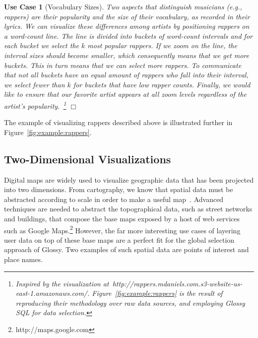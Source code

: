 \documentclass[11pt, oneside]{report}
\newtheorem{usecase}{Use Case}
\newcommand{\mathendbox}{\hfill$\Box$}
\begin{document}
{\begin{usecase}[Vocabulary Sizes]\label{ex:rappers}
Two aspects that distinguish musicians (e.g., rappers) are their popularity and the size of their vocabulary, as recorded in their lyrics. We can visualize these differences among artists by positioning rappers on a word-count line. The line is divided into buckets of word-count intervals and for each bucket we select the $k$ most popular rappers. If we zoom on the line, the interval sizes should become smaller, which consequently means that we get more buckets. This in turn means that we can select more rappers. To communicate that not all buckets have an equal amount of rappers who fall into their interval, we select fewer than $k$ for buckets that have low rapper counts. Finally, we would like to ensure that our favorite artist appears at all zoom levels regardless of the artist's popularity.~\footnote{Inspired by the visualization at~http://rappers.mdaniels.com.s3-website-us-east-1.amazonaws.com/. Figure~\ref{fig:example:rappers} is the result of reproducing their methodology over raw data sources, and employing Glossy SQL for data selection.} \mathendbox
\end{usecase}

The example of visualizing rappers described above is illustrated further in Figure~\ref{fig:example:rappers}.

\subsection{Two-Dimensional Visualizations}
\label{sec:examples:two:dimensional}

Digital maps are widely used to visualize geographic data that has been projected into two dimensions. From cartography, we know that spatial data must be abstracted according to scale in order to make a useful map~\cite{neun2009mapgeneralization,ware2003generalization_sa}. Advanced techniques are needed to abstract the topographical data, such as street networks and buildings, that compose the base maps exposed by a host of web services such as Google Maps.\footnote{http://maps.google.com} However, the far more interesting use cases of layering user data on top of these base maps are a perfect fit for the global selection approach of Glossy. Two examples of such spatial data are points of interest and place names. 

}
\end{document}
